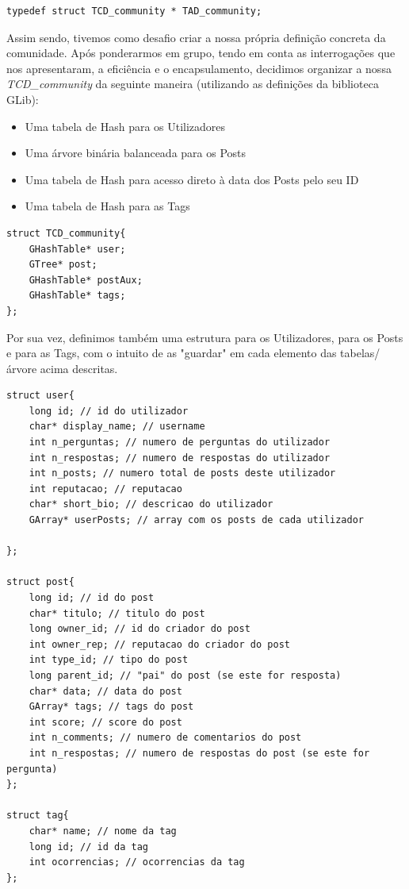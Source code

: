 \documentclass[a4paper, 11pt, oneside]{article}
\begin{document}
\begin{lstlisting}[caption=Definição da TAD\_community]
typedef struct TCD_community * TAD_community;
\end{lstlisting}

Assim sendo, tivemos como desafio criar a nossa própria definição concreta da comunidade. Após ponderarmos em grupo, tendo em conta as interrogações que nos apresentaram, a eficiência e o encapsulamento, decidimos organizar a nossa \textit{TCD\_community} da seguinte maneira (utilizando as definições da biblioteca GLib):
\begin{itemize}
\item Uma tabela de Hash para os Utilizadores
\item Uma árvore binária balanceada para os Posts
\item Uma tabela de Hash para acesso direto à data dos Posts pelo seu ID
\item Uma tabela de Hash para as Tags
\end{itemize}
\begin{lstlisting}[caption=Definição da TCD\_community]
struct TCD_community{
	GHashTable* user;
	GTree* post;
	GHashTable* postAux;
	GHashTable* tags;	
};
\end{lstlisting}

Por sua vez, definimos também uma estrutura para os Utilizadores, para os Posts e para as Tags, com o intuito de as "guardar" em cada elemento das tabelas/árvore acima descritas.

\begin{lstlisting}[caption=Definição de estruturas internas]
struct user{
	long id; // id do utilizador
	char* display_name; // username
	int n_perguntas; // numero de perguntas do utilizador
	int n_respostas; // numero de respostas do utilizador
	int n_posts; // numero total de posts deste utilizador
	int reputacao; // reputacao
	char* short_bio; // descricao do utilizador
	GArray* userPosts; // array com os posts de cada utilizador

};

struct post{
	long id; // id do post
	char* titulo; // titulo do post
	long owner_id; // id do criador do post
	int owner_rep; // reputacao do criador do post
	int type_id; // tipo do post
	long parent_id; // "pai" do post (se este for resposta)
	char* data; // data do post
	GArray* tags; // tags do post
	int score; // score do post
	int n_comments; // numero de comentarios do post
	int n_respostas; // numero de respostas do post (se este for pergunta)
};

struct tag{
	char* name; // nome da tag
	long id; // id da tag
	int ocorrencias; // ocorrencias da tag
};
\end{lstlisting}
\end{document}
